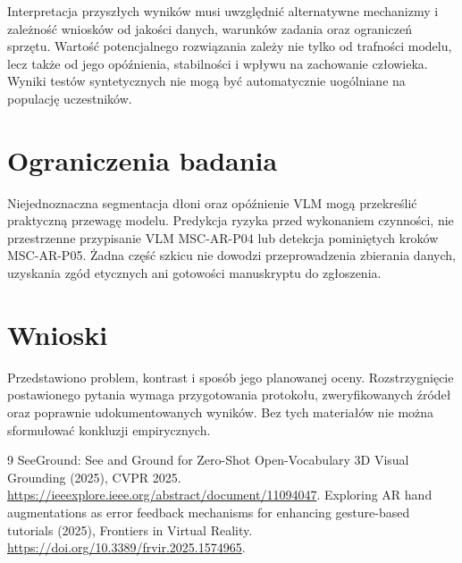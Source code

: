 \documentclass[11pt,a4paper]{article}
\begin{document}
Interpretacja przyszłych wyników musi uwzględnić alternatywne mechanizmy i zależność wniosków od jakości danych, warunków zadania oraz ograniczeń sprzętu. Wartość potencjalnego rozwiązania zależy nie tylko od trafności modelu, lecz także od jego opóźnienia, stabilności i wpływu na zachowanie człowieka. Wyniki testów syntetycznych nie mogą być automatycznie uogólniane na populację uczestników.

\section{Ograniczenia badania}

Niejednoznaczna segmentacja dłoni oraz opóźnienie VLM mogą przekreślić praktyczną przewagę modelu. Predykcja ryzyka przed wykonaniem czynności, nie przestrzenne przypisanie VLM MSC-AR-P04 lub detekcja pominiętych kroków MSC-AR-P05. Żadna część szkicu nie dowodzi przeprowadzenia zbierania danych, uzyskania zgód etycznych ani gotowości manuskryptu do zgłoszenia.

\section{Wnioski}

Przedstawiono problem, kontrast i sposób jego planowanej oceny. Rozstrzygnięcie postawionego pytania wymaga przygotowania protokołu, zweryfikowanych źródeł oraz poprawnie udokumentowanych wyników. Bez tych materiałów nie można sformułować konkluzji empirycznych.

\begin{thebibliography}{9}
 SeeGround: See and Ground for Zero-Shot Open-Vocabulary 3D Visual Grounding (2025), CVPR 2025. \url{https://ieeexplore.ieee.org/abstract/document/11094047}.
 Exploring AR hand augmentations as error feedback mechanisms for enhancing gesture-based tutorials (2025), Frontiers in Virtual Reality. \url{https://doi.org/10.3389/frvir.2025.1574965}.
\end{thebibliography}
\end{document}
